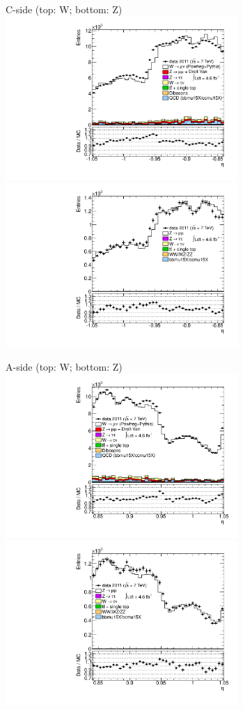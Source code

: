 {

\colb[T]

C-side (top: W; bottom: Z)
\centering
\includegraphics[width=0.66\textwidth]{dates/20130306/figures/etaphi/W_5_C_stack_l_eta_POS} \\
\includegraphics[width=0.66\textwidth]{dates/20130306/figures/etaphi/Z_5_C_stack_lP_eta_ALL.pdf}

A-side (top: W; bottom: Z)
\centering
\includegraphics[width=0.66\textwidth]{dates/20130306/figures/etaphi/W_5_A_stack_l_eta_POS} \\
\includegraphics[width=0.66\textwidth]{dates/20130306/figures/etaphi/Z_5_A_stack_lP_eta_ALL.pdf} 

\cole
}


